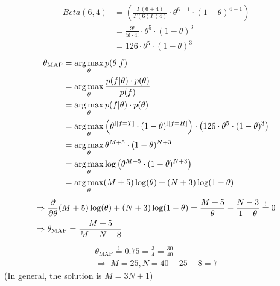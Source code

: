 %
%
%
%
%
\begin{align*}
  Beta(6,4) &= \left(\frac{\Gamma(6+4)}{\Gamma(6)\Gamma(4)} \cdot \theta^{6-1} \cdot (1-\theta)^{4-1}\right) \\
  &= \frac{9!}{5! \cdot 4!} \cdot \theta^5\cdot  (1-\theta)^3 \\
  &= 126 \cdot \theta^5 \cdot (1-\theta)^3
\end{align*}
\begin{align*}
  \theta_{\text{MAP}} &= \operatorname*{arg\,max}_\theta p(\theta|f) \\
  &= \operatorname*{arg\,max}_\theta \frac{p(f|\theta) \cdot p(\theta)}{p(f)} \\
  &= \operatorname*{arg\,max}_\theta p(f|\theta) \cdot p(\theta) \\
  &= \operatorname*{arg\,max}_\theta \left(\theta^{\mathbb{I}[f=T]} \cdot (1-\theta)^{\mathbb{I}[f=H]}\right) \cdot \left(126 \cdot \theta^5 \cdot (1-\theta)^3\right) \\
  &= \operatorname*{arg\,max}_\theta \theta^{M+5} \cdot (1-\theta)^{N+3} \\
  &= \operatorname*{arg\,max}_\theta \log\left(\theta^{M+5} \cdot (1-\theta)^{N+3}\right) \\ 
  &= \operatorname*{arg\,max}_\theta (M+5) \log(\theta) + (N+3) \log(1-\theta)
\end{align*}
\begin{align*}
  \Rightarrow \; & \frac{\partial}{\partial \theta} (M+5) \log(\theta) + (N+3) \log(1-\theta) = \frac{M+5}{\theta} - \frac{N-3}{1-\theta} \overset{!}{=} 0 \\
  \Rightarrow \; & \theta_\text{MAP} = \frac{M+5}{M+N+8}
\end{align*}
\begin{align*}
  \theta_\text{MAP} \overset{!}{=} 0.75 = \frac{3}{4} = \frac{30}{40} \\
  \Rightarrow \; M=25, N=40-25-8= 7
\end{align*}
(In general, the solution is $M=3N+1$)
%
%
%
%




